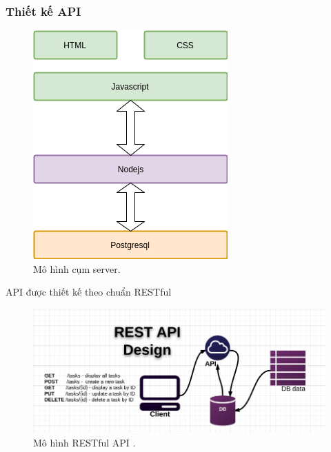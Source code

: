 \documentclass[a4paper,12pt,oneside]{article}
\begin{document}
\subsubsection{Thiết kế API}

\begin{figure}[H]
	\centering
	\includegraphics[scale=.9]{hinh/server.png}
	\caption{Mô hình cụm server.}
\end{figure}


\noindent API được thiết kế theo chuẩn RESTful

\begin{figure}[htp]
	\centering
	\includegraphics[scale=.5]{hinh/RESTful-API-design.jpg}
	\caption{Mô hình RESTful API \cite{restfultech}.}
\end{figure}
\end{document}
